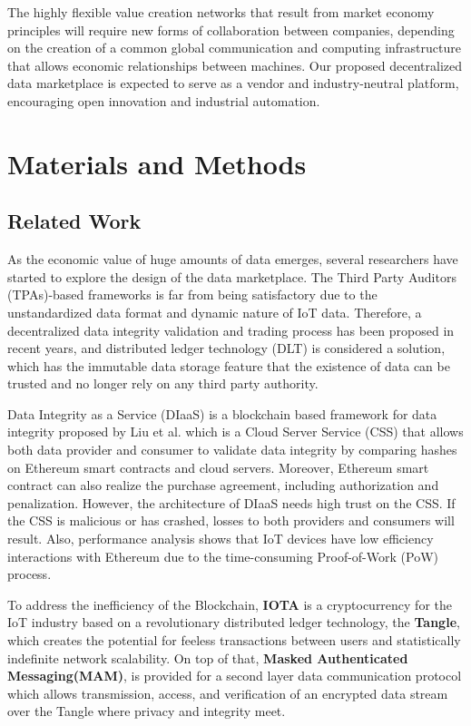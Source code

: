 \documentclass[journal,article,applsci,submit,moreauthors,pdftex]{Definitions/mdpi}
\begin{document}
The highly flexible value creation networks that result from market economy principles will require new forms of collaboration between companies, depending on the creation of a common global communication and computing infrastructure that allows economic relationships between machines. Our proposed decentralized data marketplace is expected to serve as a vendor and industry-neutral platform, encouraging open innovation and industrial automation.

\section{Materials and Methods}
\subsection{Related Work}
As the economic value of huge amounts of data emerges, several researchers have started to explore the design of the data marketplace. The Third Party Auditors (TPAs)-based frameworks\cite{TPA} is far from being satisfactory due to the unstandardized data format and dynamic nature of IoT data. Therefore, a decentralized data integrity validation and trading process has been proposed in recent years, and distributed ledger technology (DLT) is considered a solution, which has the immutable data storage feature that the existence of data can be trusted and no longer rely on any third party authority.

Data Integrity as a Service (DIaaS) is a blockchain based framework for data integrity proposed by Liu et al.\cite{DIaas} which is a Cloud Server Service (CSS) that allows both data provider and consumer to validate data integrity by comparing hashes on Ethereum smart contracts\cite{smartContract} and cloud servers. Moreover, Ethereum smart contract can also realize the purchase agreement, including authorization and penalization. However, the architecture of DIaaS needs high trust on the CSS. If the CSS is malicious or has crashed, losses to both providers and consumers will result. Also, performance analysis shows that IoT devices have low efficiency interactions with Ethereum due to the time-consuming Proof-of-Work (PoW) process.

To address the inefficiency of the Blockchain, \textbf{IOTA}\cite{IOTAwhitepaper} is a cryptocurrency for the IoT industry based on a revolutionary distributed ledger technology, the \textbf{Tangle}, which creates the potential for feeless transactions between users and statistically indefinite network scalability. On top of that, \textbf{Masked Authenticated Messaging(MAM)}\cite{MAM, MAMSpec, MAMDescription}, is provided for a second layer data communication protocol which allows transmission, access, and verification of an encrypted data stream over the Tangle where privacy and integrity meet.
\end{document}
